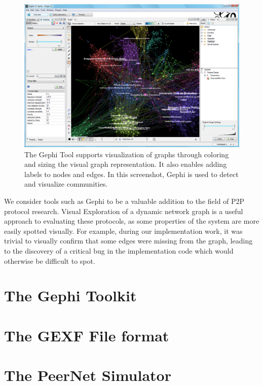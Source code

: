 \begin{figure}
\centering
\includegraphics[width=\textwidth]{img/gephi1}
\caption{The Gephi Tool supports
visualization of graphs through coloring and sizing the visual graph
representation. It also enables adding labels to nodes and edges. In
this screenshot, Gephi is used to detect and visualize
communities.}
\label{img:gephi1}
\end{figure}

We consider tools such as Gephi to be a valuable addition to the field
of P2P protocol research. Visual Exploration of a dynamic network graph
is a useful approach to evaluating these protocols, as some properties
of the system are more easily spotted visually. For example, during our
implementation work, it was trivial to visually confirm that some edges
were missing from the graph, leading to the discovery of a critical bug
in the implementation code which would otherwise be difficult to spot.

\section{The Gephi Toolkit}
\section{The GEXF File format}

\section{The PeerNet Simulator}
